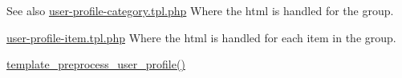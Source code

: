\begin{DoxySeeAlso}{See also}
\hyperlink{user-profile-category_8tpl_8php}{user-\/profile-\/category.tpl.php} Where the html is handled for the group. 

\hyperlink{user-profile-item_8tpl_8php}{user-\/profile-\/item.tpl.php} Where the html is handled for each item in the group. 

\hyperlink{user_8pages_8inc_a5a1229a0cb26128b7efab80c025e2d75}{template\_\-preprocess\_\-user\_\-profile()} 
\end{DoxySeeAlso}
